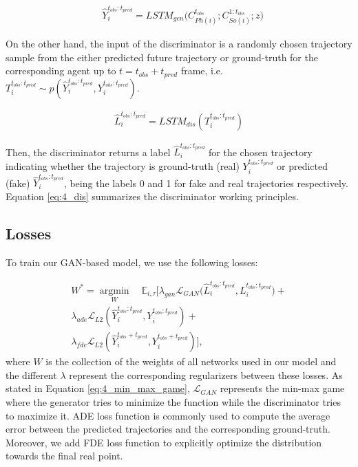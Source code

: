 \begin{eqnarray}
	\label{eq:4_gen_dec}
	& \hat{Y}_i^{t_{obs}:t_{pred}} = LSTM_{gen}\big(C_{Ph(i)}^{t_{obs}}; C_{So(i)}^{1:t_{obs}}; z\big)
\end{eqnarray}

On the other hand, the input of the discriminator is a randomly chosen trajectory sample from the either predicted future trajectory or ground-truth for the corresponding agent up to $t = t_{obs} + t_{pred}$ frame, i.e.  $T_i^{t_{obs}:t_{pred}}\sim p(\hat{Y}_i^{t_{obs}:t_{pred}},Y_i^{t_{obs}:t_{pred}})$.

\begin{eqnarray}
	\label{eq:4_dis}
	\hat{L}_{i}^{t_{obs}:t_{pred}} = LSTM_{dis}(T_i^{t_{obs}:t_{pred}})
\end{eqnarray}

Then, the discriminator returns a label $\hat{L}_{i}^{t_{obs}:t_{pred}}$ for the chosen trajectory indicating whether the trajectory is ground-truth (real) $Y_i^{t_{obs}:t_{pred}}$ or predicted (fake) $\hat{Y}_i^{t_{obs}:t_{pred}}$, being the labels 0 and 1 for fake and real trajectories respectively. Equation \ref{eq:4_dis} summarizes the discriminator working principles. 

\subsection{Losses}
\label{subsec:5_losses}

To train our \ac{GAN}-based model, we use the following losses:

\begin{eqnarray}
	\label{eq:obj}
	W^* =\operatorname*{argmin}_W \quad\mathbb{E}_{i,\tau}[\lambda_{gan} \mathcal{L}_{GAN}\big(\hat{L}_{i}^{t_{obs}:t_{pred}}, L_{i}^{t_{obs}:t_{pred}} \big)+ \nonumber\\
	\lambda_{ade} \mathcal{L}_{L2}(\hat{Y}_i^{t_{obs}:t_{pred}},Y_i^{t_{obs}:t_{pred}})+ \nonumber\\
	\lambda_{fde} \mathcal{L}_{L2}(\hat{Y}_i^{t_{obs}+t_{pred}},Y_i^{t_{obs}+t_{pred}})],
\end{eqnarray}
%
where $W$ is the collection of the weights of all networks used in our model and the different $\lambda$ represent the corresponding regularizers between these losses. As stated in Equation \ref{eq:4_min_max_game}, $\mathcal{L}_{GAN}$ represents the min-max game where the generator tries to minimize the function while the discriminator tries to maximize it. ADE loss function is commonly used to compute the average error between the predicted trajectories and the corresponding ground-truth. Moreover, we add FDE loss function to explicitly optimize the distribution towards the final real point.

